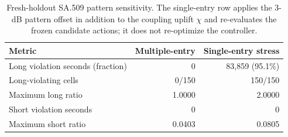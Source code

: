 \begin{table}[t]
\caption{Fresh-holdout SA.509 pattern sensitivity. The single-entry row applies the 3-dB pattern offset in addition to the coupling uplift $\chi$ and re-evaluates the frozen candidate actions; it does not re-optimize the controller.}
\label{tab:sa509-sensitivity}
\centering
\footnotesize
\setlength{\tabcolsep}{3pt}
\renewcommand{\arraystretch}{1.07}
\begin{tabular}{@{}lrr@{}}
\toprule
Metric & Multiple-entry & Single-entry stress\\
\midrule
Long violation seconds (fraction) & 0 & 83,859 (95.1\%)\\
Long-violating cells & 0/150 & 150/150\\
Maximum long ratio & 1.0000 & 2.0000\\
Short violation seconds & 0 & 0\\
Maximum short ratio & 0.0403 & 0.0805\\
\bottomrule
\end{tabular}
\end{table}

